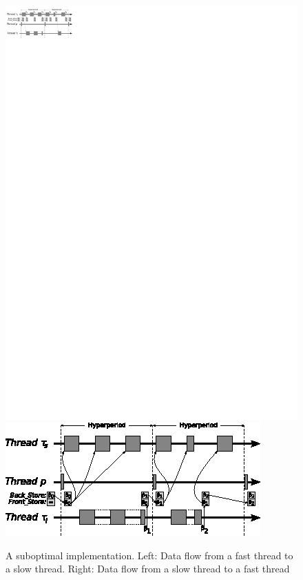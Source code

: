 \begin{figure}
\centering
\includegraphics[scale=1.5]{figs/protocol_task}
\hspace{5mm}
\includegraphics[scale=1.5]{figs/protocol2}
\caption{A suboptimal implementation. Left: Data flow from a fast
  thread to a slow thread. Right: Data flow from a slow thread to a
  fast thread}
\label{fig:protocol_thread}
\end{figure}

